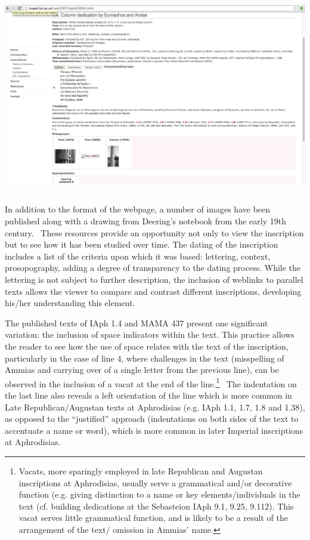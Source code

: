 \documentclass[amsthm,ebook]{saparticle}
\begin{document}
\bigskip

 \includegraphics[width=14.605cm,height=8.726cm]{PaperproposalforEAGLEfinal-img001.png} 


\bigskip


\bigskip

In addition to the format of the webpage, a number of images have been published along with a drawing from Deering’s
notebook from the early 19th century. \ These resources provide an opportunity not only to view the inscription but to
see how it has been studied over time. The dating of the inscription includes a list of the criteria upon which it was
based: lettering, context, prosopography, adding a degree of transparency to the dating process. While the lettering is
not subject to further description, the inclusion of weblinks to parallel texts allows the viewer to compare and
contrast different inscriptions, developing his/her understanding this element. 


\bigskip

The published texts of IAph 1.4 and MAMA 437 present one significant variation: the inclusion of space indicators within
the text. This practice allows the reader to see how the use of space relates with the text of the inscription,
particularly in the case of line 4, where challenges in the text (misspelling of Ammias and carrying over of a single
letter from the previous line), can be observed in the inclusion of a vacat at the end of the line.\footnote{ Vacats,
more sparingly employed in late Republican and Augustan inscriptions at Aphrodisias, usually serve a grammatical and/or
decorative function (e.g. giving distinction to a name or key elements/individuals in the text (cf. building
dedications at the Sebasteion IAph 9.1, 9.25, 9.112). This vacat serves little grammatical function, and is likely to
be a result of the arrangement of the text/ omission in Ammias’ name. } \ The indentation on the last line also reveals
a left orientation of the line which is more common in Late Republican/Augustan texts at Aphrodisias (e.g. IAph 1.1,
1.7, 1.8 and 1.38), as opposed to the “justified” approach (indentations on both sides of the text to accentuate a name
or word), which is more common in later Imperial inscriptions at Aphrodisias. 
\end{document}
